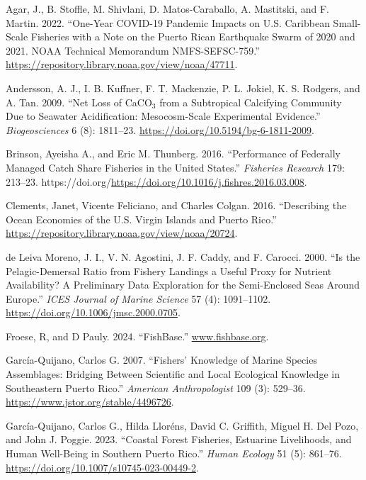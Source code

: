 \documentclass[
  letterpaper,
  oneside,
  open=any]{scrbook}
\newlength{\cslhangindent}
\newenvironment{CSLReferences}[2] %
 {\begin{list}{}{%
  \setlength{\itemindent}{0pt}
  \setlength{\leftmargin}{0pt}
  \setlength{\parsep}{0pt}
  \ifodd #1
   \setlength{\leftmargin}{\cslhangindent}
   \setlength{\itemindent}{-1\cslhangindent}
  \fi
  \setlength{\itemsep}{#2\baselineskip}}}
 {\end{list}}
\begin{document}
\label{refs}
\begin{CSLReferences}{1}{0}
Agar, J., B. Stoffle, M. Shivlani, D. Matos-Caraballo, A. Mastitski, and
F. Martin. 2022. {``One-Year COVID-19 Pandemic Impacts on U.S. Caribbean
Small-Scale Fisheries with a Note on the Puerto Rican Earthquake Swarm
of 2020 and 2021. NOAA Technical Memorandum NMFS-SEFSC-759.''}
\url{https://repository.library.noaa.gov/view/noaa/47711}.

Andersson, A. J., I. B. Kuffner, F. T. Mackenzie, P. L. Jokiel, K. S.
Rodgers, and A. Tan. 2009. {``Net Loss of CaCO\(_{3}\) from a
Subtropical Calcifying Community Due to Seawater Acidification:
Mesocosm-Scale Experimental Evidence.''} \emph{Biogeosciences} 6 (8):
1811--23. \url{https://doi.org/10.5194/bg-6-1811-2009}.

Brinson, Ayeisha A., and Eric M. Thunberg. 2016. {``Performance of
Federally Managed Catch Share Fisheries in the United States.''}
\emph{Fisheries Research} 179: 213--23.
https://doi.org/\url{https://doi.org/10.1016/j.fishres.2016.03.008}.

Clements, Janet, Vicente Feliciano, and Charles Colgan. 2016.
{``Describing the Ocean Economies of the U.S. Virgin Islands and Puerto
Rico.''} \url{https://repository.library.noaa.gov/view/noaa/20724}.

de Leiva Moreno, J. I., V. N. Agostini, J. F. Caddy, and F. Carocci.
2000. {``Is the Pelagic-Demersal Ratio from Fishery Landings a Useful
Proxy for Nutrient Availability? A Preliminary Data Exploration for the
Semi-Enclosed Seas Around Europe.''} \emph{ICES Journal of Marine
Science} 57 (4): 1091--1102.
\url{https://doi.org/10.1006/jmsc.2000.0705}.

Froese, R, and D Pauly. 2024. {``FishBase.''}
\href{https://www.fishbase.org}{www.fishbase.org}.

García-Quijano, Carlos G. 2007. {``Fishers' Knowledge of Marine Species
Assemblages: Bridging Between Scientific and Local Ecological Knowledge
in Southeastern Puerto Rico.''} \emph{American Anthropologist} 109 (3):
529--36. \url{https://www.jstor.org/stable/4496726}.

García-Quijano, Carlos G., Hilda Lloréns, David C. Griffith, Miguel H.
Del Pozo, and John J. Poggie. 2023. {``Coastal Forest Fisheries,
Estuarine Livelihoods, and Human Well-Being in Southern Puerto Rico.''}
\emph{Human Ecology} 51 (5): 861--76.
\url{https://doi.org/10.1007/s10745-023-00449-2}.


\end{CSLReferences}
\end{document}
